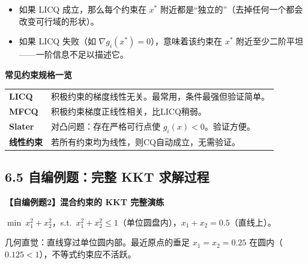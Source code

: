 \begin{itemize}
  \item 如果 LICQ 成立，那么每个约束在 $x^*$ 附近都是“独立的”（去掉任何一个都会改变可行域的形状）。
  \item 如果 LICQ 失败（如 $\nabla g_i(x^*)=0$），意味着该约束在 $x^*$ 附近至少二阶平坦——一阶信息不足以描述它。
\end{itemize}

\begin{defbox}
\textbf{常见约束规格一览}

\medskip
\begingroup
\footnotesize
\setlength{\tabcolsep}{1.5pt}
\begin{tabular}{@{}p{15mm}@{}p{72mm}@{}}
\toprule
\textbf{LICQ} & 积极约束的梯度线性无关。最常用，条件最强但验证简单。\\
\addlinespace
\textbf{MFCQ} & 积极约束梯度正线性相关，比LICQ稍弱。\\
\addlinespace
\textbf{Slater} & 对凸问题：存在严格可行点使 $g_i(x)<0$。验证方便。\\
\addlinespace
\textbf{线性约束} & 若所有约束均为线性，则CQ自动成立，无需验证。\\
\bottomrule
\end{tabular}
\endgroup
\end{defbox}

\subsection{6.5 自编例题：完整 KKT 求解过程}

\begin{notebox}
\textbf{【自编例题2】混合约束的 KKT 完整演练}

$\min\ x_1^2 + x_2^2$，s.t.\ $x_1^2 + x_2^2 \le 1$（单位圆盘内），$x_1 + x_2 = 0.5$（直线上）。

几何直觉：直线穿过单位圆内部。最近原点的垂足 $x_1=x_2=0.25$ 在圆内（$0.125<1$），不等式约束应不活跃。
\end{notebox}


